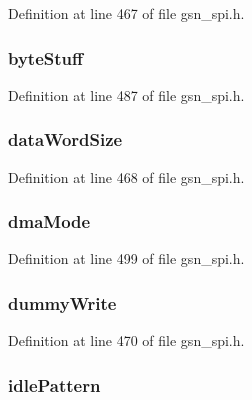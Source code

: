Definition at line 467 of file gsn\_\-spi.h.

\hypertarget{a00230_a7607005ffbebdca79ab3c4d558d0e442}{
\subsubsection[{byteStuff}]{ {\bf byteStuff}}}
\label{a00230_a7607005ffbebdca79ab3c4d558d0e442}


Definition at line 487 of file gsn\_\-spi.h.

\hypertarget{a00230_ad3c2f2d6e4146b01aa1dd5ba2745ce46}{
\subsubsection[{dataWordSize}]{ {\bf dataWordSize}}}
\label{a00230_ad3c2f2d6e4146b01aa1dd5ba2745ce46}


Definition at line 468 of file gsn\_\-spi.h.

\hypertarget{a00230_a8745e343cad523631d63304871d0bdf3}{
\subsubsection[{dmaMode}]{ {\bf dmaMode}}}
\label{a00230_a8745e343cad523631d63304871d0bdf3}


Definition at line 499 of file gsn\_\-spi.h.

\hypertarget{a00230_abdf3222930534e618e383d4015985ecf}{
\subsubsection[{dummyWrite}]{ {\bf dummyWrite}}}
\label{a00230_abdf3222930534e618e383d4015985ecf}


Definition at line 470 of file gsn\_\-spi.h.

\hypertarget{a00230_a66c4a026b5acb2b1b2974040b6936298}{
\subsubsection[{idlePattern}]{ {\bf idlePattern}}}
\label{a00230_a66c4a026b5acb2b1b2974040b6936298}



